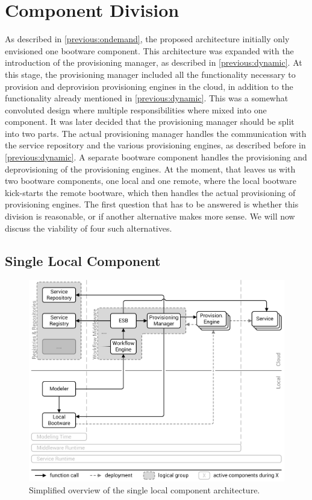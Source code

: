 \section{Component Division}
\label{design:division}

As described in \autoref{previous:ondemand}, the proposed architecture initially only envisioned one bootware component.
This architecture was expanded with the introduction of the provisioning manager, as described in \autoref{previous:dynamic}.
At this stage, the provisioning manager included all the functionality necessary to provision and deprovision provisioning engines in the cloud, in addition to the functionality already mentioned in \autoref{previous:dynamic}.
This was a somewhat convoluted design where multiple responsibilities where mixed into one component.
It was later decided that the provisioning manager should be split into two parts.
The actual provisioning manager handles the communication with the service repository and the various provisioning engines, as described before in \autoref{previous:dynamic}.
A separate bootware component handles the provisioning and deprovisioning of the provisioning engines.
At the moment, that leaves us with two bootware components, one local and one remote, where the local bootware kick-starts the remote bootware, which then handles the actual provisioning of provisioning engines.
The first question that has to be answered is whether this division is reasonable, or if another alternative makes more sense.
We will now discuss the viability of four such alternatives.

\subsection{Single Local Component}

\begin{figure}[!htbp]
	\centering
	\includegraphics[resolution=600]{design/assets/local}
	\caption{Simplified overview of the single local component architecture.}
	\label{image:local}
\end{figure}

